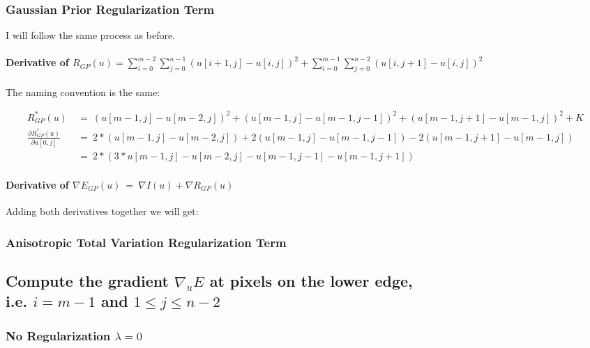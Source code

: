 \documentclass{report}
\begin{document}
			\subsubsection{Gaussian Prior Regularization Term}
			\startsubsection
				I will follow the same process as before.
				\vspace{-0.4cm} \paragraph{Derivative of $R_{GP}(u) = \sum_{i=0}^{m-2} \sum_{j=0}^{n-1} ( u[i+1,j] - u[i,j] )^2 + \sum_{i=0}^{m-1} \sum_{j=0}^{n-2} ( u[i,j+1] - u[i,j] )^2$}
				\startsubsection
					\vspace{0.2cm} The naming convention is the same:
				\closesection
				\begin{adjustwidth}{-4em}{}
					\vspace{-0.5cm}
					\begin{align*}
						R_{GP}^*(u) \ & = \ (u[m-1,j] - u[m-2,j])^2 + (u[m-1,j] - u[m-1,j-1])^2 + (u[m-1,j+1] - u[m-1,j])^2 + K \\
						\frac{\partial R_{GP}^*(u)}{\partial u[0,j]} \ & = \ 2 * (u[m-1,j] - u[m-2,j]) + 2 (u[m-1,j] - u[m-1,j-1]) - 2 (u[m-1,j+1] - u[m-1,j]) \\
						& = \ 2 * (3 * u[m-1,j] - u[m-2,j] - u[m-1,j-1] - u[m-1,j+1])
					\end{align*}
				\end{adjustwidth}
				\vspace{-0.4cm} \paragraph{Derivative of $\nabla E_{GP}(u) \ = \ \nabla I(u) + \nabla R_{GP}(u)$}
				\startsubsection
					Adding both derivatives together we will get:
				\closesection
			\closesection
			\subsubsection{Anisotropic Total Variation Regularization Term}
			\startsubsection
			\closesection
		\closesection
		\subsection{Compute the gradient $\nabla_u E$ at pixels on the lower edge, \\ i.e. $i = m-1$ and $1 \leq j \leq n-2$}
		\startsubsection
			\subsubsection{No Regularization $\lambda = 0$}
			\startsubsection
			\closesection
\end{document}
